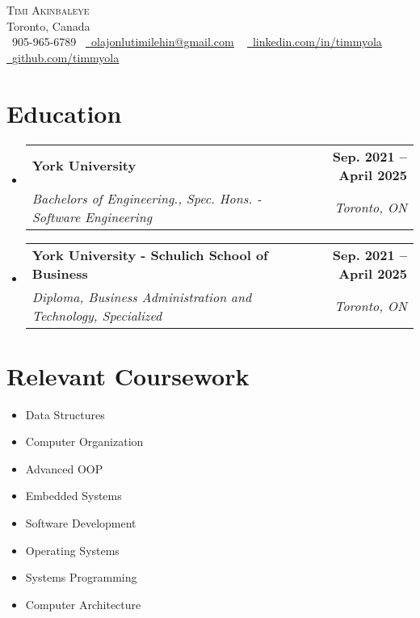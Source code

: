 \documentclass[letterpaper,11pt]{article}
\makeatletter
\newcommand{\resumeSubheading}[4]{
  \vspace{-2pt}\item
    \begin{tabular*}{1.0\textwidth}[t]{l@{\extracolsep{\fill}}r}
      \textbf{#1} & \textbf{\small #2} \\
      \textit{\small#3} & \textit{\small #4} \\
    \end{tabular*}\vspace{-7pt}
}
\newcommand{\resumeSubHeadingListStart}{\begin{itemize}[leftmargin=0.0in, label={}]}
\newcommand{\resumeSubHeadingListEnd}{\end{itemize}}
\makeatother
\begin{document}

\begin{center}
    {\Huge \scshape Timi Akinbaleye} \\ \vspace{1pt}
    Toronto, Canada \\ \vspace{1pt}
    \small \raisebox{-0.1\height}\faPhone\ 905-965-6789~ \href{mailto:olajonlutimilehin@gmail.com}{\raisebox{-0.2\height}\faEnvelope\  \underline{olajonlutimilehin@gmail.com}} ~ 
    \href{https://www.linkedin.com/in/timmyola/}{\raisebox{-0.2\height}\faLinkedin\ \underline{linkedin.com/in/timmyola}}  ~
    \href{https://github.com/timmyola}{\raisebox{-0.2\height}\faGithub\ \underline{github.com/timmyola}}
    \vspace{-8pt}
\end{center}


\section{Education}
  \resumeSubHeadingListStart
    \resumeSubheading
      {York University}{Sep. 2021 -- April 2025}
      {Bachelors of Engineering., Spec. Hons. - Software Engineering}
      {Toronto, ON}
  \resumeSubHeadingListEnd
  
    \resumeSubHeadingListStart
    \resumeSubheading
      {York University - Schulich School of Business}{Sep. 2021 -- April 2025}
      {Diploma, Business Administration and Technology, Specialized}
      {Toronto, ON}
  \resumeSubHeadingListEnd
  
\section{Relevant Coursework}
        \begin{multicols}{4}
            \begin{itemize}[itemsep=-5pt, parsep=3pt]
                \item\small Data Structures
                \item Computer Organization
                \item Advanced OOP
                \item Embedded Systems
                \item Software Development
                \item Operating Systems
                \item Systems Programming
                \item Computer Architecture
            \end{itemize}
        \end{multicols}
        \vspace*{2.0\multicolsep}
\end{document}
